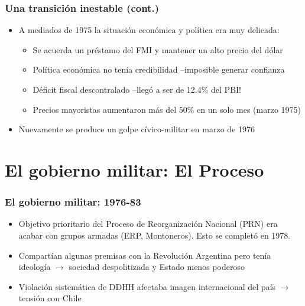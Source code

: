 \documentclass[14pt,aspectratio=169]{beamer}
\begin{document}
               \begin{frame}\frametitle{Una transición inestable (cont.)}
                 \begin{itemize}\itemsep 5pt \medskip
                 \item A mediados de 1975 la situación económica y
                   política era muy delicada:
                   \begin{itemize}\itemsep 5pt \medskip
                   \item Se acuerda un préstamo del FMI y mantener un
                     alto precio del dólar
                     \item Política económica no tenía credibilidad
                       --imposible generar confianza
                       \item Déficit fiscal descontralado --llegó a
                         ser de 12.4\% del PBI!
                         \item Precios mayoristas aumentaron más del
                           50\% en un solo mes (marzo 1975)
                         \end{itemize}
                         \item Nuevamente se produce un golpe
                           cívico-militar en marzo de 1976
                 \end{itemize}
               \end{frame}


               

               
\section{El gobierno militar: El Proceso}



     \begin{frame}\frametitle{El gobierno militar: 1976-83}
                 \begin{itemize}\itemsep 5pt \medskip
                 \item Objetivo prioritario del Proceso de
                   Reorganización Nacional (PRN) era acabar con grupos
                   armadas (ERP, Montoneros). Esto se completó en
                   1978.  
                   \item Compartían algunas
                   premisas con la Revolución Argentina pero tenía ideología $\longrightarrow$ sociedad
                     despolitizada y Estado menos poderoso
                     \item Violación sistemática de DDHH afectaba
                       imagen internacional del país $\longrightarrow$
                       tensión con Chile
                 \end{itemize}
               \end{frame}
\end{document}

